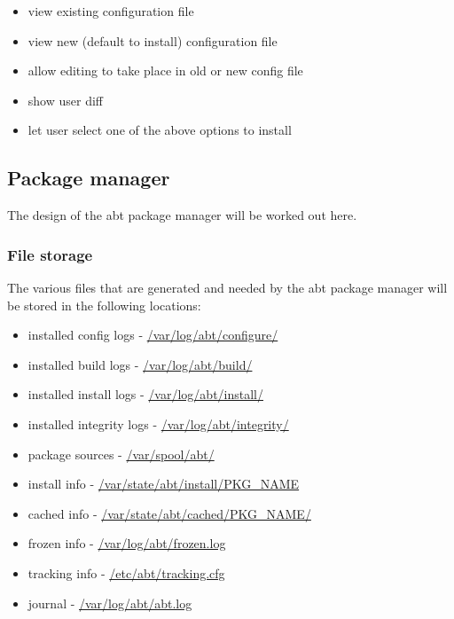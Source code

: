 \begin{itemize}
  \item view existing configuration file
  \item view new (default to install) configuration file
  \item allow editing to take place in old or new config file
  \item show user diff
  \item let user select one of the above options to install
\end{itemize}


\subsection{Package manager}
The design of the abt package manager will be worked out here.

\subsubsection{File storage}
The various files that are generated and needed by the abt package manager will be stored in the following locations:

\begin{itemize}
  \item installed config logs - \url{/var/log/abt/configure/}
  \item installed build logs - \url{/var/log/abt/build/}
  \item installed install logs - \url{/var/log/abt/install/}
  \item installed integrity logs - \url{/var/log/abt/integrity/}
  \item package sources - \url{/var/spool/abt/}
  \item install info - \url{/var/state/abt/install/PKG_NAME}
  \item cached info - \url{/var/state/abt/cached/PKG_NAME/}
  \item frozen info - \url{/var/log/abt/frozen.log}
  \item tracking info - \url{/etc/abt/tracking.cfg}
  \item journal - \url{/var/log/abt/abt.log}
\end{itemize}
